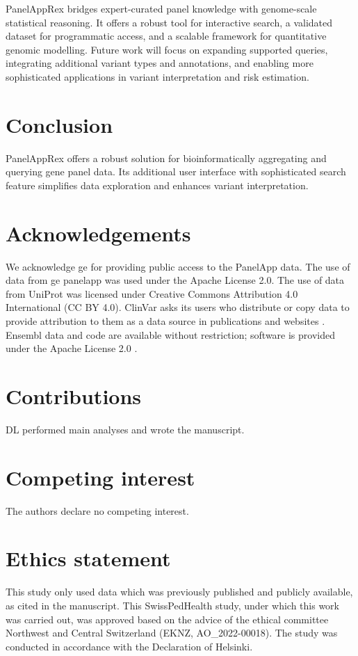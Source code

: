PanelAppRex bridges expert-curated panel knowledge with genome-scale statistical reasoning. 
It offers a robust tool for interactive search, a validated dataset for programmatic access, and a scalable framework for quantitative genomic modelling. 
Future work will focus on expanding supported queries, integrating additional variant types and annotations, and enabling more sophisticated applications in variant interpretation and risk estimation.

\section{Conclusion}
\noindent
PanelAppRex offers a robust solution for bioinformatically aggregating and querying gene panel data. Its additional user interface with sophisticated search feature simplifies data exploration and enhances variant interpretation. 

\section*{Acknowledgements}
\noindent
We acknowledge \ac{ge} for providing public access to the PanelApp data.
The use of data from \ac{ge} panelapp was used under the Apache License 2.0.
The use of data from UniProt was licensed under Creative Commons Attribution 4.0 International (CC BY 4.0).
ClinVar asks its users who distribute or copy data to provide attribution to them as a data source in publications and websites \cite{landrum_clinvar_2018}.
Ensembl data and code are available without restriction; software is provided under the Apache License 2.0 \cite{dyer_ensembl_2025}.

\section*{Contributions}
\noindent 
DL performed main analyses and wrote the manuscript.

\section*{Competing interest}
\noindent
The authors declare no competing interest. 

\section*{Ethics statement}
\noindent
This study only used data which was previously published and publicly available, as cited in the manuscript.
This  SwissPedHealth study, under which this work was carried out, was approved based on the advice of the ethical committee Northwest and Central Switzerland (EKNZ, AO\_2022-00018). 
The study was conducted in accordance with the Declaration of Helsinki.


